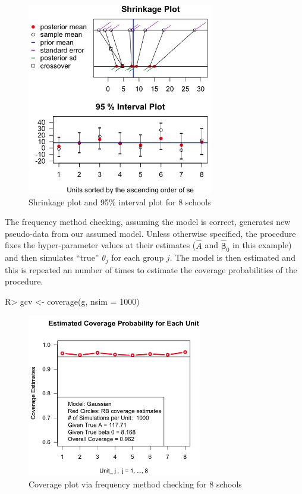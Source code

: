 \documentclass[article]{jss}
\begin{document}
\begin{figure}[h] 
\begin{center}
\includegraphics[width = 3.2in]{school1.png}
\caption{Shrinkage plot and 95\% interval plot for 8 schools}
\label{fig:8schoolsplot}
\end{center}
\end{figure}


The frequency method checking, assuming the model is correct, generates new pseudo-data from our assumed model. Unless otherwise specified, the procedure fixes the hyper-parameter values at their estimates ($\hat{A}$ and $\hat{\boldsymbol{\beta}}_0$ in this example) and then simulates ``true'' $\theta_j$ for each group $j$. The model is then estimated and this is repeated an  number of times to estimate the coverage probabilities of the procedure.  

\begin{CodeChunk}
\begin{CodeInput}
R> gcv <- coverage(g, nsim = 1000)
\end{CodeInput}
\end{CodeChunk}
\begin{figure}[h] 
\begin{center}
\includegraphics[width = 3in]{school2.png}
\caption{Coverage plot via frequency method checking for 8 schools}
\label{fig:schoolcoverage}
\end{center}
\end{figure}
\end{document}
